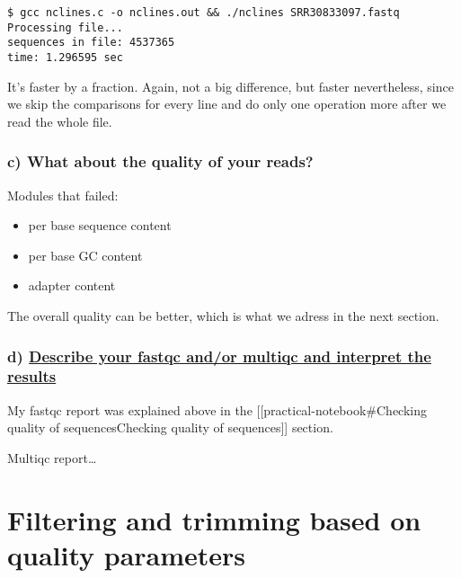 \begin{verbatim}
$ gcc nclines.c -o nclines.out && ./nclines SRR30833097.fastq
Processing file...
sequences in file: 4537365
time: 1.296595 sec
\end{verbatim}

It's faster by a fraction. Again, not a big difference, but faster
nevertheless, since we skip the comparisons for every line and do only
one operation more after we read the whole file.

\hypertarget{c-what-about-the-quality-of-your-reads}{%
\subsubsection{c) What about the quality of your
reads?}\label{c-what-about-the-quality-of-your-reads}}

Modules that failed:

\begin{itemize}
\tightlist
\item
  per base sequence content
\item
  per base GC content
\item
  adapter content
\end{itemize}

The overall quality can be better, which is what we adress in the next
section.

\hypertarget{d-describe-your-fastqc-andor-multiqc-and-interpret-the-results}{%
\subsubsection{\texorpdfstring{d)
\href{https://mugenomicscore.missouri.edu/PDF/FastQC_Manual.pdf}{Describe
your fastqc and/or multiqc and interpret the
results}}{d) Describe your fastqc and/or multiqc and interpret the results}}\label{d-describe-your-fastqc-andor-multiqc-and-interpret-the-results}}

My fastqc report was explained above in the
{[}{[}practical-notebook\#Checking quality of sequences\textbar Checking
quality of sequences{]}{]} section.

Multiqc report\ldots{}

\hypertarget{filtering-and-trimming-based-on-quality-parameters}{%
\section{Filtering and trimming based on quality
parameters}\label{filtering-and-trimming-based-on-quality-parameters}}

